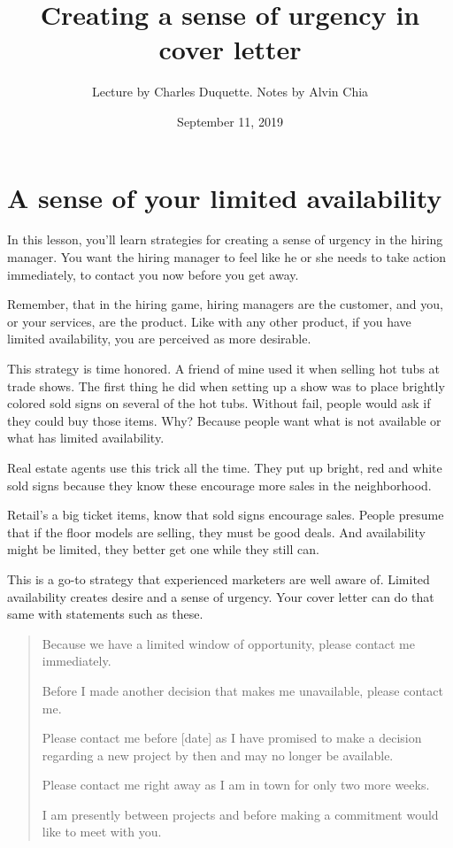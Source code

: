 \documentclass[12pt]{article}
\begin{document}
\title{Creating a sense of urgency in cover letter}
\author{Lecture by Charles Duquette. Notes by Alvin Chia}
\date{September 11, 2019}
\maketitle
\setcounter{secnumdepth}{1}
\section{A sense of your limited availability}
In this lesson, you'll learn strategies for creating a sense of urgency
in the hiring manager. You want the hiring manager to feel like he or
she needs to take action immediately, to contact you now before you get
away.

Remember, that in the hiring game, hiring managers are the customer, and
you, or your services, are the product. Like with any other product, if
you have limited availability, you are perceived as more desirable.

This strategy is time honored. A friend of mine used it when selling hot
tubs at trade shows. The first thing he did when setting up a show was
to place brightly colored sold signs on several of the hot tubs. Without
fail, people would ask if they could buy those items. Why? Because
people want what is not available or what has limited availability.

Real estate agents use this trick all the time. They put up bright, red
and white sold signs because they know these encourage more sales in the
neighborhood.

Retail's a big ticket items, know that sold signs encourage sales.
People presume that if the floor models are selling, they must be good
deals. And availability might be limited, they better get one while they
still can.

This is a go-to strategy that experienced marketers are well aware of.
Limited availability creates desire and a sense of urgency. Your cover
letter can do that same with statements such as these.

\begin{quote}
Because we have a limited window of opportunity, please contact me
immediately.

Before I made another decision that makes me unavailable, please contact
me.

Please contact me before {[}date{]} as I have promised to make a
decision regarding a new project by then and may no longer be available.

Please contact me right away as I am in town for only two more weeks.

I am presently between projects and before making a commitment would
like to meet with you.
\end{quote}
\end{document}
